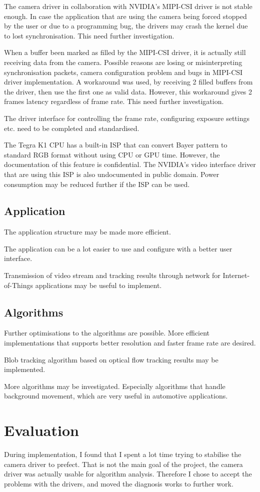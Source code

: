 The camera driver in collaboration with NVIDIA's MIPI-CSI driver is not stable enough. In case the application that are using the camera being forced stopped by the user or due to a programming bug, the drivers may crash the kernel due to lost synchronisation. This need further investigation.

When a buffer been marked as filled by the MIPI-CSI driver, it is actually still receiving data from the camera. Possible reasons are losing or misinterpreting synchronisation packets, camera configuration problem and bugs in MIPI-CSI driver implementation. A workaround was used, by receiving 2 filled buffers from the driver, then use the first one as valid data. However, this workaround gives 2 frames latency regardless of frame rate. This need further investigation.

The driver interface for controlling the frame rate, configuring exposure settings etc. need to be completed and standardised.

The Tegra K1 CPU has a built-in ISP that can convert Bayer pattern to standard RGB format without using CPU or GPU time. However, the documentation of this feature is confidential. The NVIDIA's video interface driver that are using this ISP is also undocumented in public domain. Power consumption may be reduced further if the ISP can be used.

\subsection{Application}

The application structure may be made more efficient.

The application can be a lot easier to use and configure with a better user interface.

Transmission of video stream and tracking results through network for Internet-of-Things applications may be useful to implement.

\subsection{Algorithms}

Further optimisations to the algorithms are possible. More efficient implementations that supports better resolution and faster frame rate are desired.

Blob tracking algorithm based on optical flow tracking results may be implemented.

More algorithms may be investigated. Especially algorithms that handle background movement, which are very useful in automotive applications.

\section{Evaluation}

During implementation, I found that I spent a lot time trying to stabilise the camera driver to prefect. That is not the main goal of the project, the camera driver was actually usable for algorithm analysis. Therefore I chose to accept the problems with the drivers, and moved the diagnosis works to further work.

